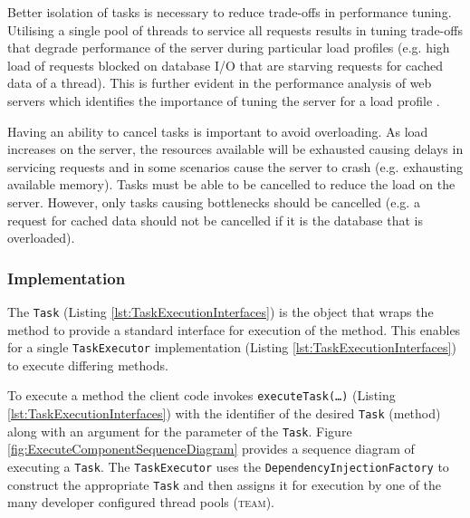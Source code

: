 \documentclass[prodmode]{style/acmlarge}
\begin{document}
Better isolation of tasks is necessary to reduce trade-offs in performance
tuning.  Utilising a single pool of threads to service all requests results in
tuning trade-offs that degrade performance of the server during particular load
profiles (e.g. high load of requests blocked on database I/O that are starving
requests for cached data of a thread).  This is further evident in the
performance analysis of web servers which identifies the importance of tuning
the server for a load profile
\cite{tuning-important,low-server-footprint,tuning-os-important}.

Having an ability to cancel tasks is important to avoid overloading.  As
load increases on the server, the resources available will be exhausted causing
delays in servicing requests and in some scenarios cause the server to crash
(e.g. exhausting available memory).  Tasks must be able to be cancelled to
reduce the load on the server.  However, only tasks causing bottlenecks
should be cancelled (e.g. a request for cached data should not be cancelled if
it is the database that is overloaded).


\subsubsection*{Implementation}

The \texttt{Task} (Listing \ref{lst:TaskExecutionInterfaces}) is the object that wraps
the method to provide a standard interface for execution of the method.  This
enables for a single \texttt{TaskExecutor} implementation (Listing
\ref{lst:TaskExecutionInterfaces}) to execute differing methods.

To execute a method the client code invokes \texttt{executeTask(\ldots)}
(Listing \ref{lst:TaskExecutionInterfaces}) with the identifier of the desired
\texttt{Task} (method) along with an argument for the parameter of the
\texttt{Task}.  Figure \ref{fig:ExecuteComponentSequenceDiagram} provides a
sequence diagram of executing a \texttt{Task}.  The \texttt{TaskExecutor} uses the
\texttt{DependencyInjectionFactory} to construct the appropriate \texttt{Task}
and then assigns it for execution by one of the many developer configured thread
pools (\textsc{team}).
\end{document}
